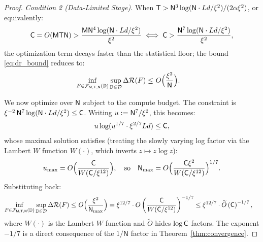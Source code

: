 \documentclass[11pt]{article}
\theoremstyle{plain}
\newcommand{\wt}{\widetilde}
\begin{document}
\begin{proof}
    {\it Condition 2 (Data-Limited Stage).} When ${\sf T} > {\sf N}^3 \log({\sf N}\cdot Ld /\xi^2)/(2\alpha\xi^2)$, or equivalently:
    \begin{align*}
        {\sf C} = O({\sf MTN}) > \frac{{\sf M}{\sf N}^4\log( {\sf N}  \cdot Ld/\xi^2)}{\xi^2}
        \iff {\sf C} > \frac{{\sf N}^7\log( {\sf N}  \cdot Ld/\xi^2)}{\xi^2},
    \end{align*}
    the optimization term decays faster than the statistical floor; the bound \eqref{eq:dr_bound} reduces to:
    \begin{align*}
        \inf_{F \in {\cal F}_{\sf M, T, N}(\mathbb{D})} \sup_{\mathbb{D} \in {\cal D}}  \Delta{\cal R}(F)  \leq & ~ O\Big(\frac{\xi^2}{{\sf N}} \Big).
    \end{align*}

    We now optimize over ${\sf N}$ subject to the compute budget. The constraint is $\xi^{-2}\,{\sf N}^7\log({\sf N}\cdot Ld/\xi^2) \le {\sf C}$. Writing $u := {\sf N}^7/\xi^2$, this becomes:
    \begin{align*}
        u\log(u^{1/7} \cdot \xi^{2/7} Ld) \leq {\sf C},
    \end{align*}
    whose maximal solution satisfies (treating the slowly varying log factor via the Lambert $W$ function $W(\cdot)$, which inverts $z\mapsto z\log z$):
    \begin{align*}
        u_{\max} = O\Big( \frac{{\sf C}}{W({\sf C}/\xi^{12})}\Big),
        \quad\text{so}\quad
        {\sf N}_{\max} = O\Big( \frac{{\sf C}\xi^2}{W({\sf C}/\xi^{12})} \Big)^{1/7}.
    \end{align*}
    Substituting back:
    \begin{align*}
        \inf_{F \in {\cal F}_{\sf M, T, N}(\mathbb{D})} \sup_{\mathbb{D} \in {\cal D}}  \Delta{\cal R}(F)  \leq & ~ O\Big(\frac{\xi^2}{{\sf N}_{\max}} \Big) = \xi^{12/7} \cdot O\left( \frac{{\sf C}}{W({\sf C}/\xi^{12})} \right)^{-1/7} \leq \xi^{12/7} \cdot \wt{O}\left( {\sf C} \right)^{-1/7},
    \end{align*}
    where $W(\cdot)$ is the Lambert $W$ function and $\wt O$ hides $\log {\sf C}$ factors. The exponent $-1/7$ is a direct consequence of the $1/\mathsf{N}$ factor in Theorem~\ref{thm:convergence}.
\end{proof}
\end{document}
